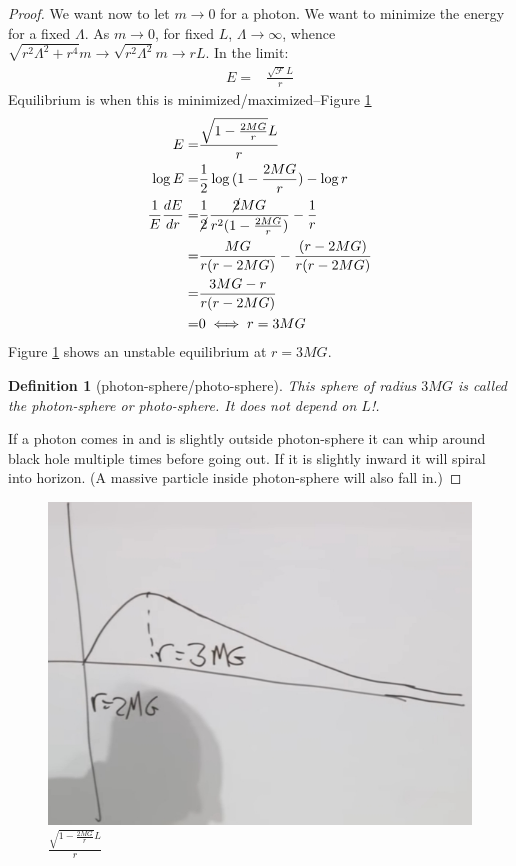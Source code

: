 \documentclass[]{article}
\newtheorem{defn}[thm]{Definition}
\begin{document}
{\begin{proof}
	We want now to let $m \rightarrow 0$ for a photon. We want to minimize the energy for a fixed $\Lambda$. As $m \rightarrow 0$, for fixed $L$, $\Lambda\rightarrow\infty$, whence $\sqrt{r^2 \Lambda^2 + r^4} m \rightarrow \sqrt{r^2 \Lambda^2 } m \rightarrow rL$. In the limit:
	\begin{align*}
		E =& \frac{\sqrt{\mathscr{F}} L }{r}
	\end{align*}
	Equilibrium is when this is minimized/maximized--Figure \ref{fig:gr-6-energy-r}
	\begin{align*}
		E 		=& \frac{\sqrt{1-\frac{2MG}{r}} L }{r}\\
		\log{E} =& \frac{1}{2} \log{(1-\frac{2MG}{r})} - \log{r}\\
		\frac{1}{E} \frac{dE}{dr} =& \frac{1}{\cancel{2}} \frac{\cancel{2}MG}{r^2 (1-\frac{2MG}{r})} - \frac{1}{r}\\
		=& \frac{MG}{r(r-2MG)} -\frac{(r-2MG)}{r(r-2MG)}\\
		=& \frac{3MG-r}{r(r-2MG)}\\
		=& 0 \iff r=3MG
	\end{align*}	
	Figure \ref{fig:gr-6-energy-r} shows an unstable equilibrium at $r=3MG$.
	
	\begin{defn}[photon-sphere/photo-sphere]
		This sphere of radius $3MG$ is called the photon-sphere or photo-sphere. It does not depend on $L$!.
	\end{defn} 

	 If a photon comes in and is slightly outside photon-sphere it can whip around black hole multiple times before going out. If it is slightly inward it will spiral into horizon. (A massive particle inside photon-sphere will also fall in.)

\end{proof}	
	
\begin{figure}[H]
	\caption{$\frac{\sqrt{1-\frac{2MG}{r}} L }{r}$}\label{fig:gr-6-energy-r}
	\includegraphics{gr-6-energy-r}
\end{figure}


}
\end{document}
